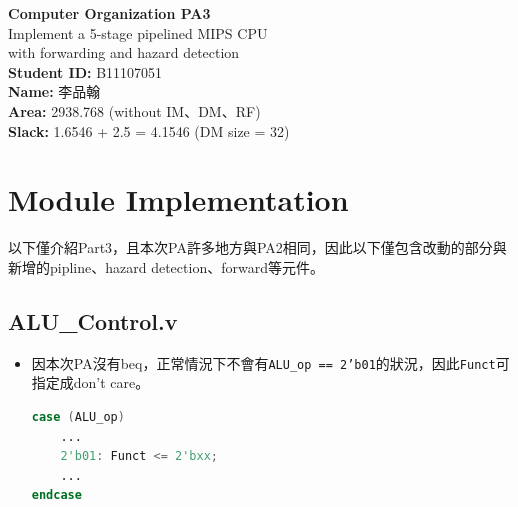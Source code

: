 \documentclass[12pt]{article}
\begin{document}
\begin{titlepage}
    \thispagestyle{empty}
    \vspace*{\fill} %
    \begin{center}
        \LARGE\textbf{Computer Organization PA3} \\[1.0em]
        \Large Implement a 5-stage pipelined MIPS CPU \\ with forwarding and hazard detection \\[2.0em]
        \normalsize
        \textbf{Student ID:} B11107051 \\[0.5em]
        \textbf{Name:} 李品翰 \\[0.5em]
        \textbf{Area:} 2938.768 (without IM、DM、RF) \\
        \textbf{Slack:} 1.6546 + 2.5 = 4.1546 (DM size = 32) \\[2em]
    \end{center}
    \vspace*{\fill} %
\end{titlepage}


\section{Module Implementation}

以下僅介紹Part3，且本次PA許多地方與PA2相同，因此以下僅包含改動的部分與新增的pipline、hazard detection、forward等元件。

\subsection{ALU\_Control.v}
\begin{itemize}
    \item 因本次PA沒有beq，正常情況下不會有\texttt{ALU\_op == 2'b01}的狀況，因此\texttt{Funct}可指定成don't care。
    \begin{lstlisting}[language=Verilog]
case (ALU_op)
    ...
    2'b01: Funct <= 2'bxx;
    ...
endcase
    \end{lstlisting}
\end{itemize}
\end{document}
